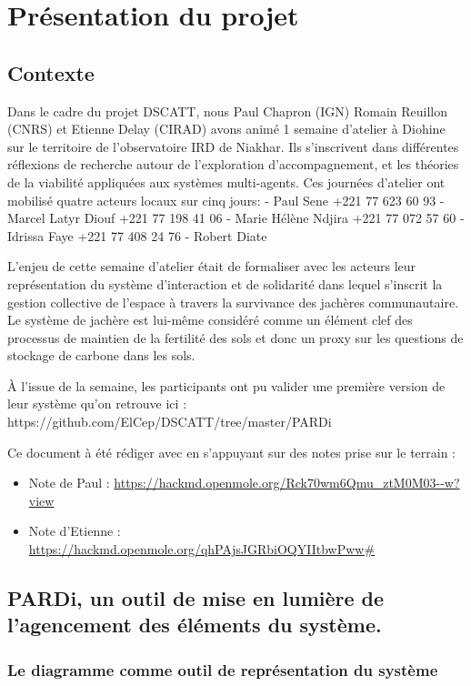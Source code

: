 \chapter{Présentation du projet}


\section{Contexte}

Dans le cadre du projet DSCATT, nous Paul Chapron (IGN) Romain Reuillon (CNRS) et Etienne Delay (CIRAD) avons animé 1 semaine d'atelier à Diohine sur le territoire de l'observatoire IRD de Niakhar. Ils s'inscrivent dans différentes réflexions de recherche autour de l'exploration d'accompagnement, et les théories de la viabilité appliquées aux systèmes multi-agents.
Ces journées d'atelier ont mobilisé quatre acteurs locaux sur cinq jours:
- Paul Sene +221 77 623 60 93
- Marcel Latyr Diouf +221 77 198 41 06
- Marie Hélène Ndjira +221 77 072 57 60
- Idrissa Faye +221 77 408 24 76
- Robert Diate

L'enjeu de cette semaine d'atelier était de formaliser avec les acteurs leur représentation du système d'interaction et de solidarité dans lequel s'inscrit la gestion collective de l'espace à travers la survivance des jachères communautaire. Le système de jachère est lui-même considéré comme un élément clef des processus de maintien de la fertilité des sols et donc un proxy sur les questions de stockage de carbone dans les sols.

À l'issue de la semaine, les participants ont pu valider une première version de leur système qu'on retrouve ici : https://github.com/ElCep/DSCATT/tree/master/PARDi

Ce document à été rédiger avec en s'appuyant sur des notes prise sur le terrain :
\begin{itemize}
  \item Note de Paul : \url{https://hackmd.openmole.org/Rck70wm6Qmu_ztM0M03--w?view}
  \item Note d'Etienne : \url{https://hackmd.openmole.org/qhPAjsJGRbiOQYIItbwPww#}
\end{itemize}


\section{PARDi, un outil de mise en lumière de l'agencement des éléments du système.}

\subsection{Le diagramme comme outil de représentation du système}


